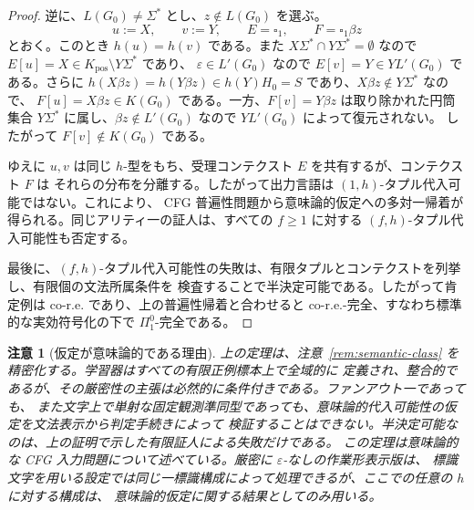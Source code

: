 \documentclass[11pt,a4paper]{ltjsarticle}
\newtheorem{remark}[theorem]{注意}
\theoremstyle{remark}
\newcommand{\blank}{\square}
\newcommand{\eps}{\varepsilon}
\begin{document}
\begin{proof}
逆に、\(L(G_0)\ne\Sigma^*\) とし、\(z\notin L(G_0)\) を選ぶ。
\[
  u:=X,
  \qquad v:=Y,
  \qquad E=\blank_1,
  \qquad F=\blank_1\beta z
\]
とおく。このとき \(h(u)=h(v)\) である。また
\(X\Sigma^*\cap Y\Sigma^*=\emptyset\) なので
\(E[u]=X\in K_{\mathrm{pos}}\setminus Y\Sigma^*\) であり、
\(\eps\in L'(G_0)\) なので \(E[v]=Y\in YL'(G_0)\) である。さらに
\(h(X\beta z)=h(Y\beta z)\in h(Y)H_0=S\) であり、\(X\beta z\notin Y\Sigma^*\) なので、
\(F[u]=X\beta z\in K(G_0)\) である。一方、\(F[v]=Y\beta z\) は取り除かれた円筒集合
\(Y\Sigma^*\) に属し、\(\beta z\notin L'(G_0)\) なので \(YL'(G_0)\) によって復元されない。
したがって \(F[v]\notin K(G_0)\) である。

ゆえに \(u,v\) は同じ \(h\)-型をもち、受理コンテクスト \(E\) を共有するが、コンテクスト \(F\) は
それらの分布を分離する。したがって出力言語は \((1,h)\)-タプル代入可能ではない。これにより、
CFG 普遍性問題から意味論的仮定への多対一帰着が得られる。同じアリティ一の証人は、すべての
\(f\ge1\) に対する \((f,h)\)-タプル代入可能性も否定する。

最後に、\((f,h)\)-タプル代入可能性の失敗は、有限タプルとコンテクストを列挙し、有限個の文法所属条件を
検査することで半決定可能である。したがって肯定例は co-r.e. であり、上の普遍性帰着と合わせると
co-r.e.-完全、すなわち標準的な実効符号化の下で \(\Pi^0_1\)-完全である。
\end{proof}

\begin{remark}[仮定が意味論的である理由]
\label{rem:promise-undecidable}
上の定理は、注意~\ref{rem:semantic-class} を精密化する。学習器はすべての有限正例標本上で全域的に
定義され、整合的であるが、その厳密性の主張は必然的に条件付きである。ファンアウト一であっても、
また文字上で単射な固定観測準同型であっても、意味論的代入可能性の仮定を文法表示から判定手続きによって
検証することはできない。半決定可能なのは、上の証明で示した有限証人による失敗だけである。
この定理は意味論的な CFG 入力問題について述べている。厳密に \(\eps\)-なしの作業形表示版は、
標識文字を用いる設定では同じ一標識構成によって処理できるが、ここでの任意の \(h\) に対する構成は、
意味論的仮定に関する結果としてのみ用いる。
\end{remark}
\end{document}

